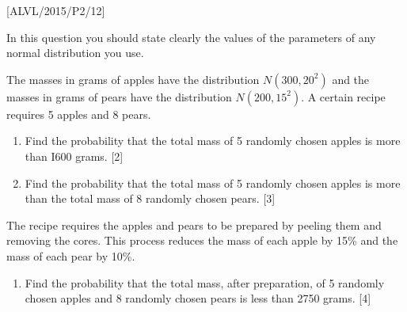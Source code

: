 \item {[}ALVL/2015/P2/12{]}

In this question you should state clearly the values of the parameters
of any normal distribution you use. 

The masses in grams of apples have the distribution $N\left(300,20^{2}\right)$
and the masses in grams of pears have the distribution $N\left(200,15^{2}\right)$.
A certain recipe requires 5 apples and 8 pears. 
\begin{enumerate}
\item Find the probability that the total mass of 5 randomly chosen apples
is more than I600 grams. \hfill{}{[}2{]}
\item Find the probability that the total mass of 5 randomly chosen apples
is more than the total mass of 8 randomly chosen pears. \hfill{}
{[}3{]}
\end{enumerate}
The recipe requires the apples and pears to be prepared by peeling
them and removing the cores. This process reduces the mass of each
apple by 15\% and the mass of each pear by 10\%. 
\begin{enumerate}
\item Find the probability that the total mass, after preparation, of 5
randomly chosen apples and 8 randomly chosen pears is less than 2750
grams. \hfill{}{[}4{]}
\end{enumerate}
